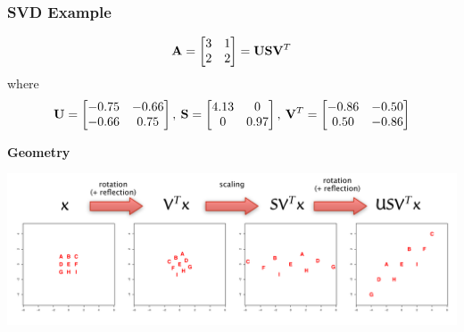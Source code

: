 \documentclass{beamer}
\begin{document}
\begin{frame}[fragile]
  \frametitle{SVD Example}

\[
\mathbf{A} =  \begin{bmatrix}3 & 1 \\ 2 & 2\end{bmatrix} = \mathbf{U} \mathbf{S} \mathbf{V}^T
\]
where
\[
\mathbf{U} = \begin{bmatrix} -0.75 & -0.66 \\ -0.66 & 0.75 \end{bmatrix}, \:
\mathbf{S} = \begin{bmatrix} 4.13 & 0 \\ 0 & 0.97 \end{bmatrix}, \:
\mathbf{V}^T = \begin{bmatrix} -0.86 & -0.50 \\ 0.50 & -0.86 \end{bmatrix}
\]

\medskip
\textbf{Geometry}
\begin{center}
\includegraphics[width=\textwidth]{fig-svd-example}
\end{center}

\end{frame}




\end{document}
